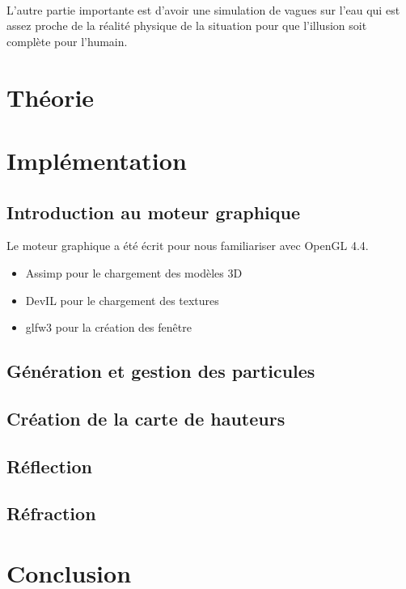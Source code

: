 \documentclass[a4paper, 12pt]{article} %
\begin{document}
    \paragraph{}
    L'autre partie importante est d'avoir une simulation de vagues sur l'eau qui est assez
    proche de la réalité physique de la situation pour que l'illusion soit complète pour 
    l'humain. 

\section{Théorie}
\section{Implémentation}
\subsection{Introduction au moteur graphique}
Le moteur graphique a été écrit pour nous familiariser avec OpenGL 4.4.
\begin{itemize}
	\item Assimp pour le chargement des modèles 3D
	\item DevIL pour le chargement des textures
	\item glfw3 pour la création des fenêtre
\end{itemize}

\subsection{Génération et gestion des particules}
\subsection{Création de la carte de hauteurs}
\subsection{Réflection}
\subsection{Réfraction}
\section{Conclusion}
\end{document}
